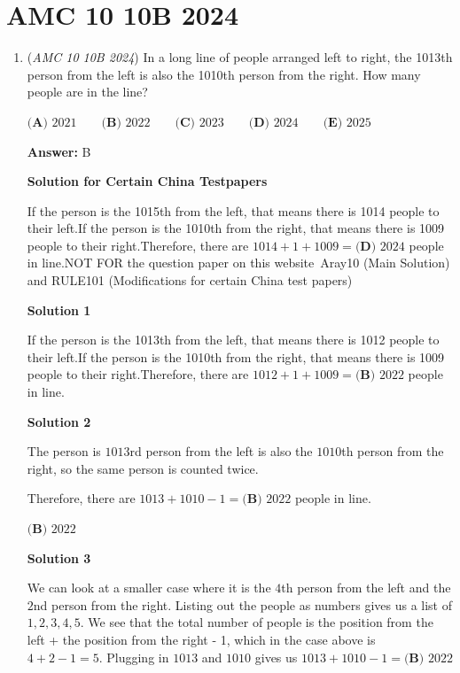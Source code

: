\section{AMC 10 10B 2024}
        \begin{enumerate}
        	\item (\textit{AMC 10 10B 2024}) In a long line of people arranged left to right, the 1013th person from the left is also the 1010th person from the right. How many people are in the line?


 $\textbf{(A) } 2021 \qquad\textbf{(B) } 2022 \qquad\textbf{(C) } 2023 \qquad\textbf{(D) } 2024 \qquad\textbf{(E) } 2025$

 \textbf{Answer: }B



\textbf{Solution for Certain China Testpapers}

If the person is the 1015th from the left, that means there is 1014 people to their left.If the person is the 1010th from the right, that means there is 1009 people to their right.Therefore, there are $1014 + 1 + 1009 = \boxed{\textbf{(D) } 2024}$ people in line.NOT FOR the question paper on this website~Aray10 (Main Solution) and RULE101 (Modifications for certain China test papers)

 



\textbf{Solution 1}

If the person is the 1013th from the left, that means there is 1012 people to their left.If the person is the 1010th from the right, that means there is 1009 people to their right.Therefore, there are $1012 + 1 + 1009 = \boxed{\textbf{(B) } 2022}$ people in line.

 



\textbf{Solution 2}

The person is $1013$rd person from the left is also the $1010$th person from the right, so the same person is counted twice.

 Therefore, there are $1013+1010-1=\boxed{\textbf{(B) } 2022}$ people in line.

 $\boxed{\textbf{(B) } 2022}$




\textbf{Solution 3}

We can look at a smaller case where it is the $4$th person from the left and the $2$nd person from the right. Listing out the people as numbers gives us a list of $1,2,3,4,5.$ We see that the total number of people is the position from the left + the position from the right - 1, which in the case above is $4+2-1=5.$ Plugging in $1013$ and $1010$ gives us $1013+1010-1=\boxed{\textbf{(B) } 2022}$





\end{enumerate}
